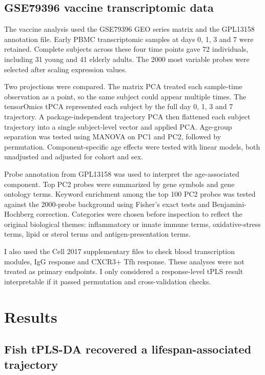 \documentclass[11pt,a4paper]{article}
\begin{document}
\subsection{GSE79396 vaccine transcriptomic data}

The vaccine analysis used the GSE79396 GEO series matrix and the GPL13158 annotation file. Early PBMC transcriptomic samples at days 0, 1, 3 and 7 were retained. Complete subjects across these four time points gave 72 individuals, including 31 young and 41 elderly adults. The 2000 most variable probes were selected after scaling expression values.

Two projections were compared. The matrix PCA treated each sample-time observation as a point, so the same subject could appear multiple times. The tensorOmics tPCA represented each subject by the full day 0, 1, 3 and 7 trajectory. A package-independent trajectory PCA then flattened each subject trajectory into a single subject-level vector and applied PCA. Age-group separation was tested using MANOVA on PC1 and PC2, followed by permutation. Component-specific age effects were tested with linear models, both unadjusted and adjusted for cohort and sex.

Probe annotation from GPL13158 was used to interpret the age-associated component. Top PC2 probes were summarized by gene symbols and gene ontology terms. Keyword enrichment among the top 100 PC2 probes was tested against the 2000-probe background using Fisher's exact tests and Benjamini-Hochberg correction. Categories were chosen before inspection to reflect the original biological themes: inflammatory or innate immune terms, oxidative-stress terms, lipid or sterol terms and antigen-presentation terms.

I also used the Cell 2017 supplementary files to check blood transcription modules, IgG response and CXCR3+ Tfh response. These analyses were not treated as primary endpoints. I only considered a response-level tPLS result interpretable if it passed permutation and cross-validation checks.

\FloatBarrier

\section{Results}

\subsection{Fish tPLS-DA recovered a lifespan-associated trajectory}
\end{document}
